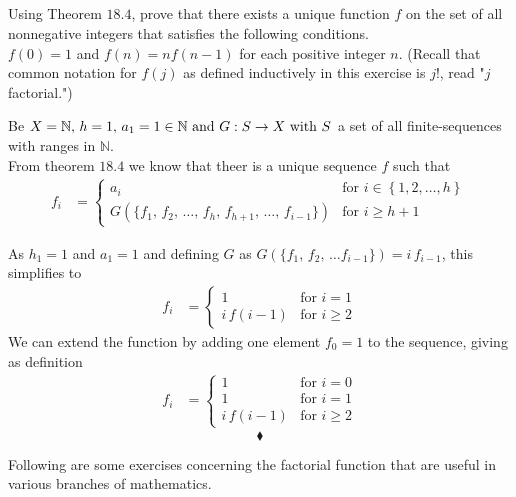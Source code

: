 \subsection{}
\begin{tcolorbox}
Using Theorem $\mathbf{18.4}$, prove that there exists a unique function $f$ on the set of all nonnegative integers that satisfies the following conditions. \\
$f(0) = 1 $ and $ f(n) =nf(n- 1)$ for each positive integer $n$. (Recall that common notation for $f(j)$ as defined inductively in this exercise is $j!$, read "$j$ factorial.")  
\end{tcolorbox}
$$ $$
Be $X=\mathbb{N},\, h=1,\, a_1=1\in \mathbb{N}\text{ and } G: S\rightarrow X\text{ with } S$ a set of all finite-sequences with ranges in $\mathbb{N}$.\\
From theorem $\mathbf{18.4}$ we know that theer is a unique sequence $f$ such that 
\begin{align*}
f_i&= \left\{
\begin{array}{ll}
a_i& \text{for } i\in \left\{1,2,\dots, h\right\}\\
G\left(\{f_1,\,f_2,\,\dots ,\, f_h,\, f_{h+1},\,\dots,\, f_{i-1}\}\right) & \text{for } i\ge h+1
\end{array}
\right.
\end{align*}

As $h_1=1$ and $ a_1=1$ and defining $G$ as $G\left(\{f_1,\,f_2,\,\dots f_{i-1}\}\right)=i\,f_{i-1} $, this simplifies to 
\begin{align*}
f_i&= \left\{
\begin{array}{ll}
1& \text{for } i=1\\
i\, f(i-1) & \text{for } i\ge 2
\end{array}
\right.
\end{align*}
We can extend the function by adding one element $f_0=1$ to the sequence, giving as definition 
\begin{align*}
f_i&= \left\{
\begin{array}{ll}
1& \text{for } i=0\\
1& \text{for } i=1\\
i\, f(i-1) & \text{for } i\ge 2
\end{array}
\right.
\end{align*}
$$\blacklozenge$$

Following are some exercises concerning the factorial function that are useful in various branches of mathematics.\\


